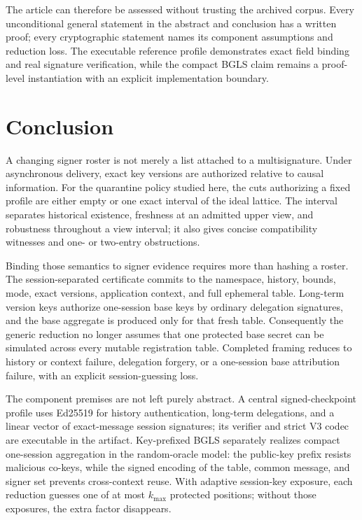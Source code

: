 \documentclass[11pt]{article}
\theoremstyle{definition}
\begin{document}
The article can therefore be assessed without trusting the archived corpus.  Every unconditional general statement in the abstract and conclusion has a written proof; every cryptographic statement names its component assumptions and reduction loss.  The executable reference profile demonstrates exact field binding and real signature verification, while the compact BGLS claim remains a proof-level instantiation with an explicit implementation boundary.

\section{Conclusion}\label{sec:conclusion}
A changing signer roster is not merely a list attached to a multisignature.  Under asynchronous delivery, exact key versions are authorized relative to causal information.  For the quarantine policy studied here, the cuts authorizing a fixed profile are either empty or one exact interval of the ideal lattice.  The interval separates historical existence, freshness at an admitted upper view, and robustness throughout a view interval; it also gives concise compatibility witnesses and one- or two-entry obstructions.

Binding those semantics to signer evidence requires more than hashing a roster.  The session-separated certificate commits to the namespace, history, bounds, mode, exact versions, application context, and full ephemeral table.  Long-term version keys authorize one-session base keys by ordinary delegation signatures, and the base aggregate is produced only for that fresh table.  Consequently the generic reduction no longer assumes that one protected base secret can be simulated across every mutable registration table.  Completed framing reduces to history or context failure, delegation forgery, or a one-session base attribution failure, with an explicit session-guessing loss.

The component premises are not left purely abstract.  A central signed-checkpoint profile uses Ed25519 for history authentication, long-term delegations, and a linear vector of exact-message session signatures; its verifier and strict V3 codec are executable in the artifact.  Key-prefixed BGLS separately realizes compact one-session aggregation in the random-oracle model: the public-key prefix resists malicious co-keys, while the signed encoding of the table, common message, and signer set prevents cross-context reuse.  With adaptive session-key exposure, each reduction guesses one of at most $k_{\max}$ protected positions; without those exposures, the extra factor disappears.
\end{document}
